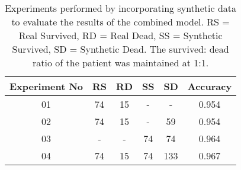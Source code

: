 \begin{table}[hbt!]
\centering
\caption{Experiments performed by incorporating synthetic data to evaluate the results of the combined model. RS = Real Survived, RD = Real Dead, SS = Synthetic Survived, SD = Synthetic Dead. The survived: dead ratio of the patient was maintained at 1:1.}
\begin{tabular}{|c|c|c|c|c|c|}
\hline
Experiment No & RS & RD & SS & SD  & Accuracy \\ \hline
01            & 74 & 15 & -  & -   & 0.954    \\ \hline
02            & 74 & 15 & -  & 59  & 0.954    \\ \hline
03            & -  & -  & 74 & 74  & 0.964    \\ \hline
04            & 74 & 15 & 74 & 133 & 0.967    \\ \hline
\end{tabular}
\label{tbl:experiments_table}
\end{table}